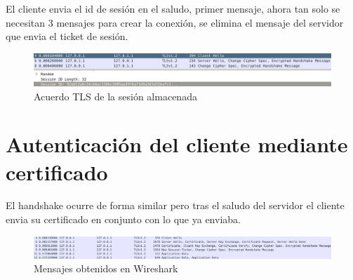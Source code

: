 \documentclass[11pt]{article}
\begin{document}
    \par
    El cliente envia el id de sesión en el saludo, primer mensaje, ahora tan
    solo se necesitan 3 mensajes para crear la conexión, se elimina el mensaje
    del servidor que envia el ticket de sesión.

    \begin{figure}[H]
      \centering
      \includegraphics[width = \textwidth]{tls3}
      \caption{Acuerdo TLS de la sesión almacenada}
    \end{figure}


  \section{Autenticación del cliente mediante certificado}
    \par
    El handshake ocurre de forma similar pero tras el saludo del servidor el
    cliente envia su certificado en conjunto con lo que ya enviaba.

    \begin{figure}[H]
      \centering
      \includegraphics[width = \textwidth]{tls_client}
      \caption{Mensajes obtenidos en Wireshark}
    \end{figure}
\end{document}
